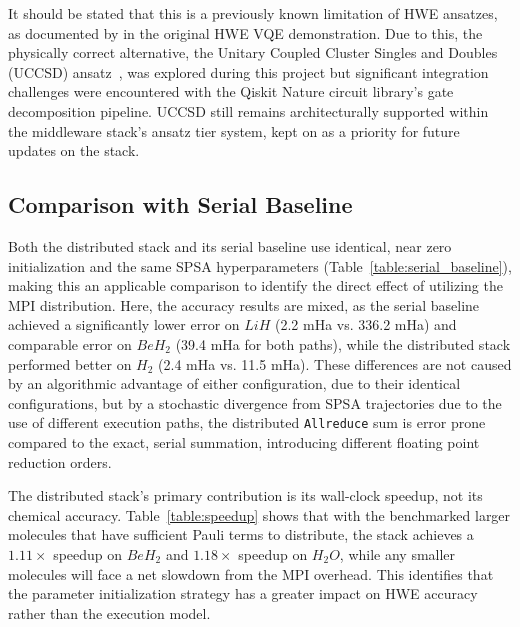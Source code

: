 It should be stated that this is a previously known limitation of HWE ansatzes, as documented by \textcite{kandala2017hardware} 
in the original HWE VQE demonstration. Due to this, the physically correct alternative, the Unitary Coupled Cluster Singles and Doubles (UCCSD) ansatz~\parencite{romero2018strategiesquantumcomputingmolecular},
was explored during this project but significant integration challenges were encountered with the Qiskit Nature circuit 
library's gate decomposition pipeline. UCCSD still remains architecturally supported within the middleware stack's ansatz tier 
system, kept on as a priority for future updates on the stack.

\subsection{Comparison with Serial Baseline}
Both the distributed stack and its serial baseline use identical, near zero initialization and the same SPSA hyperparameters 
(Table~\ref{table:serial_baseline}), making this an applicable comparison to identify the direct effect of utilizing the MPI distribution. 
Here, the accuracy results are mixed, as the serial baseline achieved a significantly lower error on $LiH$ (2.2 mHa vs. 336.2 mHa) 
and comparable error on $BeH_{2}$ (39.4 mHa for both paths), while the distributed stack performed better on $H_{2}$ (2.4 mHa vs. 11.5 mHa). 
These differences are not caused by an algorithmic advantage of either configuration, due to their identical configurations, but by a stochastic divergence from SPSA 
trajectories due to the use of different execution paths, the distributed \texttt{Allreduce} sum is error 
prone compared to the exact, serial summation, introducing different floating point reduction orders.

The distributed stack's primary contribution is its wall-clock speedup, not its chemical accuracy. Table~\ref{table:speedup} 
shows that with the benchmarked larger molecules that have sufficient Pauli terms to distribute, the stack achieves a $1.11\times$ speedup 
on $BeH_{2}$ and $1.18\times$ speedup on $H_{2}O$, while any smaller molecules will face a net slowdown from the MPI
overhead. This identifies that the parameter initialization strategy has a greater impact on HWE accuracy rather than the execution model.

